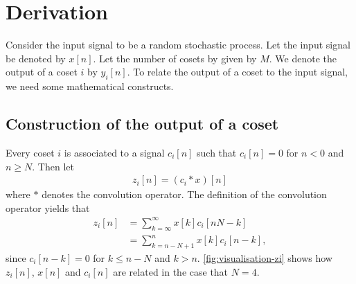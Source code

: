 \documentclass[a4paper, openany, oneside]{memoir}
\begin{document}
\section{Derivation}
Consider the input signal to be a random stochastic process. Let the input signal be denoted by $x[n]$. Let the number of cosets by given by $M$. We denote the output of a coset $i$ by $y_i[n]$. To relate the output of a coset to the input signal, we need some mathematical constructs.

\subsection{Construction of the output of a coset}
Every coset $i$ is associated to a signal $c_i[n]$ such that $c_i[n] = 0$ for $n < 0$ and $n \ge N$. Then let
\begin{align*}
    z_i[n] = (c_i \ast x)[n]
\end{align*}
where $\ast$ denotes the convolution operator. The definition of the convolution operator yields that
\begin{align*}
    z_i[n] &= \sum_{k=\infty}^{\infty}x[k] c_i[nN-k] \\
    &= \sum_{k=n-N+1}^{n} x[k] c_i[n-k],
\end{align*}
since $c_i[n-k]=0$ for $k \le n-N$ and $k > n$. \cref{fig:visualisation-zi} shows how $z_i[n]$, $x[n]$ and $c_i[n]$ are related in the case that $N=4$.
\end{document}
